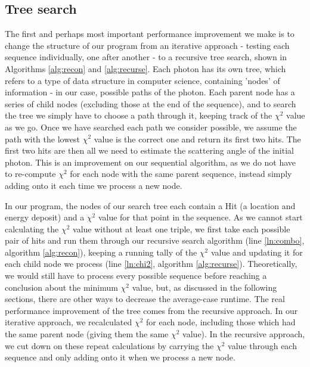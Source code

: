 \subsection{Tree search}
The first and perhaps most important performance improvement we make is to change the structure of our program from an iterative approach - testing each sequence individually, one after another - to a recursive tree search, shown in Algorithms \ref{alg:recon} and \ref{alg:recurse}. Each photon has its own tree, which refers to a type of data structure in computer science, containing 'nodes' of information - in our case, possible paths of the photon. Each parent node has a series of child nodes (excluding those at the end of the sequence), and to search the tree we simply have to choose a path through it, keeping track of the $\chi^2$ value as we go. Once we have searched each path we consider possible, we assume the path with the lowest $\chi^2$ value is the correct one and return its first two hits.  The first two hits are then all we need to estimate the scattering angle of the initial photon. This is an improvement on our sequential algorithm, as we do not have to re-compute $\chi^2$ for each node with the same parent sequence, instead simply adding onto it each time we process a new node.

In our program, the nodes of our search tree each contain a Hit (a location and energy deposit) and a $\chi^2$ value for that point in the sequence. As we cannot start calculating the $\chi^2$ value without at least one triple, we first take each possible pair of hits and run them through our recursive search algorithm (line \ref{ln:combo}, algorithm \ref{alg:recon}), keeping a running tally of the $\chi^2$ value and updating it for each child node we process (line \ref{ln:chi2}, algorithm \ref{alg:recurse}). Theoretically, we would still have to process every possible sequence before reaching a conclusion about the minimum $\chi^2$ value, but, as discussed in the following sections, there are other ways to decrease the average-case runtime. The real performance improvement of the tree comes from the recursive approach. In our iterative approach, we recalculated $\chi^2$ for each node, including those which had the same parent node (giving them the same $\chi^2$ value). In the recursive approach, we cut down on these repeat calculations by carrying the $\chi^2$ value through each sequence and only adding onto it when we process a new node. 

